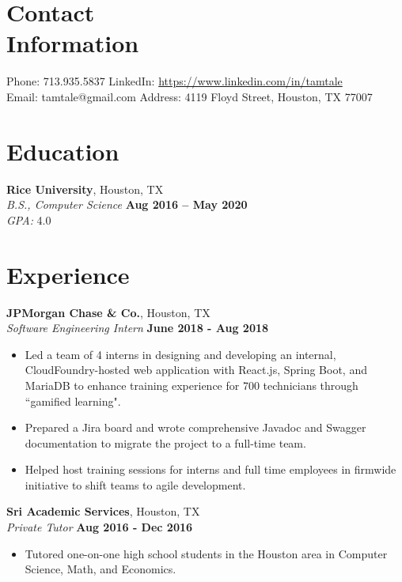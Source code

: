 \documentclass[margin,line]{resume}
\begin{document}
\begin{resume}
    \section{\mysidestyle Contact\\Information}

    Phone: 713.935.5837       \hfill LinkedIn: \url{https://www.linkedin.com/in/tamtale
    } \\
    \noindent Email: tamtale@gmail.com  \hfill
    Address: 4119 Floyd Street, Houston, TX 77007 

    \section{\mysidestyle Education}

    \textbf{Rice University}, Houston, TX \vspace{1mm}\\
    \textsl{B.S., Computer Science} \hfill \textbf{Aug 2016 -- May 2020} \vspace{1mm}\\
    \textsl{GPA: } 4.0 

\section{\mysidestyle Experience}

\textbf{JPMorgan Chase \& Co.}, Houston, TX \vspace{2mm}\\\vspace{1mm}%
\textsl{Software Engineering Intern} \hfill \textbf{June 2018 - Aug 2018}
\begin{itemize}
    \item Led a team of 4 interns in designing and developing an internal, CloudFoundry-hosted web application with React.js, Spring Boot, and MariaDB to enhance training experience for 700 technicians through ``gamified learning".
    \item Prepared a Jira board and wrote comprehensive Javadoc and Swagger documentation to migrate the project to a full-time team.
    \item Helped host training sessions for interns and full time employees in firmwide initiative to shift teams to agile development.
\end{itemize}

\textbf{Sri Academic Services}, Houston, TX \vspace{2mm}\\\vspace{1mm}%
\textsl{Private Tutor} \hfill \textbf{Aug 2016 - Dec 2016}
\begin{itemize}
    \item Tutored one-on-one high school students in the Houston area in Computer Science, Math, and Economics.
\end{itemize}


\end{resume}
\end{document}
